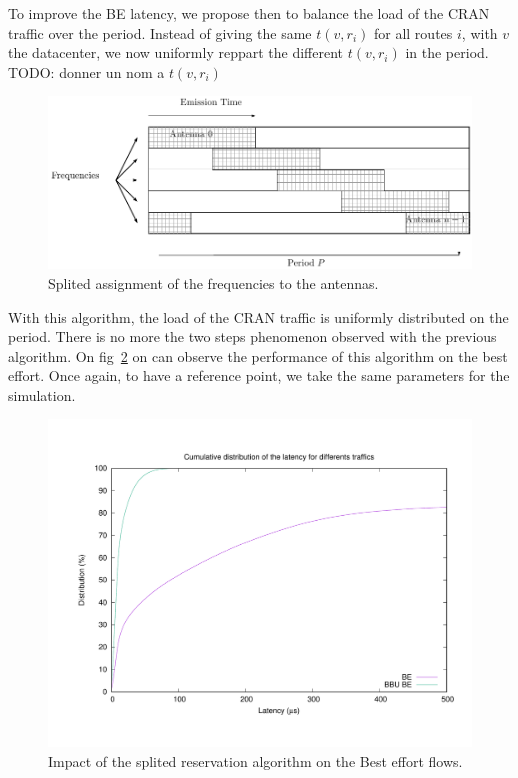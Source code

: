 \documentclass[a4paper,10pt,french,english]{article}
\newcommand{\todo}[1]{{\color{red} TODO: {#1}}}
\begin{document}
To improve the BE latency, we propose then to balance the load of the CRAN traffic over the period. Instead of giving the same $t(v,r_i)$ for all routes $i$, with $v$ the datacenter, we now uniformly reppart the different $t(v,r_i)$ in the period. 
\todo{donner un nom a $t(v,r_i)$}

   \begin{figure}[!h]

      \includegraphics[scale=0.7]{freqsplited.pdf}
     \caption{Splited assignment of the frequencies to the antennas.}   \label{fig:freqS}
  \end{figure}
  
  With this algorithm, the load of the CRAN traffic is uniformly distributed on the period. There is no more the two steps phenomenon observed with the previous algorithm. On fig~\ref{fig:res2} on can observe the performance of this algorithm on the best effort. Once again, to have a reference point, we take the same parameters for the simulation.

 \begin{figure}[h]
\centering
      \includegraphics[scale=0.4]{res2.pdf}
     \caption{Impact of the splited reservation algorithm on the Best effort flows.}   \label{fig:res2}
  \end{figure}
  
\end{document}
